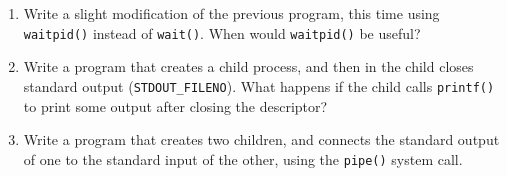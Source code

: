 \documentclass[12pt]{article}
\begin{document}
\begin{enumerate}[1.]
    \item Write a slight modification of the previous program, this time using
    \texttt{waitpid()} instead of \texttt{wait()}. When would \texttt{waitpid()}
    be useful?

    \item Write a program that creates a child process, and then in the child
    closes standard output (\texttt{STDOUT\_FILENO}). What happens if the child
    calls \texttt{printf()} to print some output after closing the descriptor?

    \item Write a program that creates two children, and connects the standard output of one to the standard input of the other, using the
    \texttt{pipe()} system call.
\end{enumerate}
\end{document}
